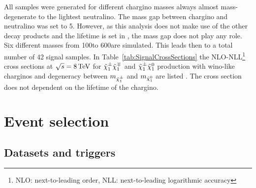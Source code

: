 All samples were generated for different chargino masses always almost mass-degenerate to the lightest neutralino.
The mass gap between chargino and neutralino was set to 5\gev.
However, as this analysis does not make use of the other decay products and the lifetime is set in \geant, the mass gap does not play any role.
Six different masses from 100\gev to 600\gev are simulated.
This leads then to a total number of 42 signal samples.
In Table~\ref{tab:SignalCrossSections} the NLO-NLL\footnote{NLO: next-to-leading order, NLL: next-to-leading logarithmic accuracy} cross sections at $\sqrt{s}=8\,\text{Te}\kern-0.06667em\text{V}$ for $\tilde{\chi}^{\pm}_{1}\tilde{\chi}^{\mp}_{1}$ and $\tilde{\chi}^{\pm}_{1}\tilde{\chi}^{0}_{1}$ production 
with wino-like charginos and degeneracy between $m_{\tilde{\chi}^{\pm}_{1}}$ and $m_{\tilde{\chi}^{0}_{1}}$ are listed \cite{bib:SignalCrossSection_2012,bib:SignalCrossSection_2013}.
The cross section does not dependent on the lifetime of the chargino.
\renewcommand{\arraystretch}{1.5}
\begin{table}[h]
\centering
\caption{Produced signal simulated samples with corresponding cross sections}
\label{tab:SignalCrossSections}
\end{table}  
\section{Event selection}
\label{sec:EventSelection}
\subsection{Datasets and triggers}
\label{subsec:DatasetsAndTriggers}

